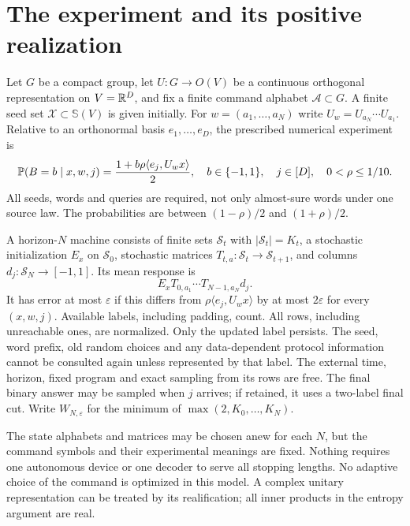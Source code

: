 \section{The experiment and its positive realization}\label{sec:model}
Let $G$ be a compact group, let $U:G\to O(V)$ be a continuous orthogonal
representation on $V=\mathbb R^D$, and fix a finite command alphabet
$\mathcal A\subset G$. A finite seed set $\mathcal X\subset\mathbb S(V)$
is given initially. For $w=(a_1,\ldots,a_N)$ write
$U_w=U_{a_N}\cdots U_{a_1}$. Relative to an orthonormal basis
$e_1,\ldots,e_D$, the prescribed numerical experiment is
\begin{equation}\label{eq:law}
 \mathbb P(B=b\mid x,w,j)=\frac{1+b\rho\langle e_j,U_wx\rangle}{2},
 \quad b\in\{-1,1\},\quad j\in[D],\quad0<\rho\le1/10.
\end{equation}
All seeds, words and queries are required, not only almost-sure words
under one source law. The probabilities are between $(1-\rho)/2$ and
$(1+\rho)/2$.

\begin{definition}\label{def:machine}
A horizon-$N$ machine consists of finite sets $\mathcal S_t$ with
$|\mathcal S_t|=K_t$, a stochastic initialization $E_x$ on $\mathcal S_0$,
stochastic matrices $T_{t,a}:\mathcal S_t\to\mathcal S_{t+1}$, and
columns $d_j:\mathcal S_N\to[-1,1]$. Its mean response is
\begin{equation}\label{eq:machine}
 E_xT_{0,a_1}\cdots T_{N-1,a_N}d_j.
\end{equation}
It has error at most $\varepsilon$ if this differs from
$\rho\langle e_j,U_wx\rangle$ by at most $2\varepsilon$ for every
$(x,w,j)$. Available labels, including padding, count. All rows, including
unreachable ones, are normalized. Only the updated label persists.
The seed, word prefix, old random choices and any data-dependent protocol
information cannot be consulted again unless represented by that label.
The external time, horizon, fixed program and exact sampling from its
rows are free. The final binary answer may be sampled when $j$ arrives;
if retained, it uses a two-label final cut. Write $W_{N,\varepsilon}$ for
the minimum of $\max(2,K_0,\ldots,K_N)$.
\end{definition}
The state alphabets and matrices may be chosen anew for each $N$, but the
command symbols and their experimental meanings are fixed. Nothing
requires one autonomous device or one decoder to serve all stopping
lengths. No adaptive choice of the command is optimized in this model.
A complex unitary representation can be treated by its realification;
all inner products in the entropy argument are real.

